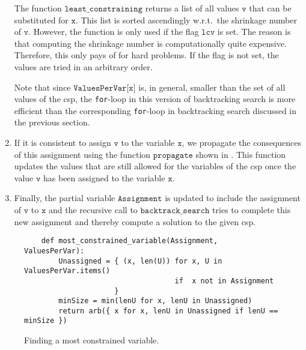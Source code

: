 \begin{enumerate}
      The function $\texttt{least\_constraining}$ returns a list of all values $\texttt{v}$
      that can be substituted for $\texttt{x}$.  This list is sorted ascendingly w.r.t.~the shrinkage number of
      $\texttt{v}$.  However, the function is only used if the flag $\texttt{lcv}$ is set.  The reason is that
      computing the shrinkage number is computationally quite expensive.  Therefore, this only pays of for hard
      problems.  If the flag is not set, the values are tried in an arbitrary order.

      Note that since
      $\texttt{ValuesPerVar[x]}$ is, in general, smaller than the set of all values of the \ac{csp},
      the \texttt{for}-loop in this version of backtracking search is more efficient than the corresponding
      \texttt{for}-loop in backtracking search discussed in the previous section. 
\item If it is consistent to assign $\texttt{v}$ to the variable $\texttt{x}$, we propagate the consequences
      of this assignment using the function $\texttt{propagate}$ shown in
      .
      This function updates the values that are still allowed for the variables of the \ac{csp} once the
      value $\texttt{v}$ has been assigned to the variable $\texttt{x}$.
\item Finally, the partial variable $\texttt{Assignment}$ is updated to include the assignment of 
      $\texttt{v}$ to $\texttt{x}$ and the recursive call to $\texttt{backtrack\_search}$ tries to complete this new
      assignment and thereby compute a solution to the given \ac{csp}. 
\end{enumerate}

\begin{figure}[!ht]
\centering
\begin{verbatim}
    def most_constrained_variable(Assignment, ValuesPerVar):
        Unassigned = { (x, len(U)) for x, U in ValuesPerVar.items()
                                   if  x not in Assignment
                     }
        minSize = min(lenU for x, lenU in Unassigned)
        return arb({ x for x, lenU in Unassigned if lenU == minSize })
\end{verbatim}
\vspace*{-0.3cm}
\caption{Finding a most constrained variable.}
\label{fig:Constraint-Propagation-Solver.ipynb:most_constrained_variable}
\end{figure}

